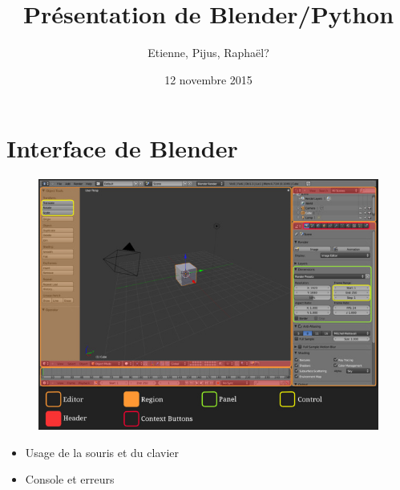 \documentclass[11pt,usenames,dvipsnames]{beamer}
\author{Etienne, Pijus, Raphaël?}
\title{Présentation de Blender/Python}
\date{12 novembre 2015}
\begin{document}
\frame{\titlepage}


\begin{frame}
\tableofcontents[
  currentsection,
  sectionstyle=show/show,
  subsectionstyle=hide/hide]
\end{frame}


\section{Interface de Blender}

\begin{frame}
  \begin{figure}
    \includegraphics[scale=0.5]{blender-ui1.jpg}
  \end{figure}
\end{frame}

\begin{frame}
  \begin{itemize}
  \item Usage de la souris et du clavier
  \item Console et erreurs
  \end{itemize}
    
\end{frame}
\end{document}
